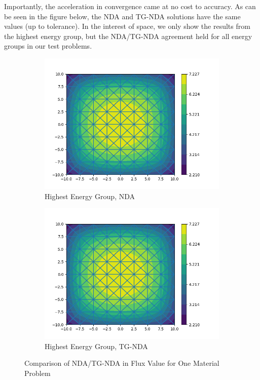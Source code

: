 Importantly, the acceleration in convergence came at no cost to accuracy. As can be seen in the figure below, the NDA and TG-NDA solutions have the same values (up to tolerance). In the interest of space, we only show the results from the highest energy group, but the NDA/TG-NDA agreement held for all energy groups in our test problems.
\begin{figure}[H]
\centering
\begin{subfigure}{.5\textwidth}
  \centering
  \includegraphics[width=\linewidth]{fig/nda_c5g7mod_scalar_flux_group0.png}
  \caption{Highest Energy Group, NDA}
  \label{fig:NDA-Mod}
\end{subfigure}%
\begin{subfigure}{.5\textwidth}
  \centering
  \includegraphics[width=\linewidth]{fig/tgnda_c5g7mod_scalar_flux_group0.png}
  \caption{Highest Energy Group, TG-NDA}
  \label{fig:TG-NDA-Mod}
\end{subfigure}
\caption{Comparison of NDA/TG-NDA in Flux Value for One Material Problem}
\label{fig:Moderator}
\end{figure}
